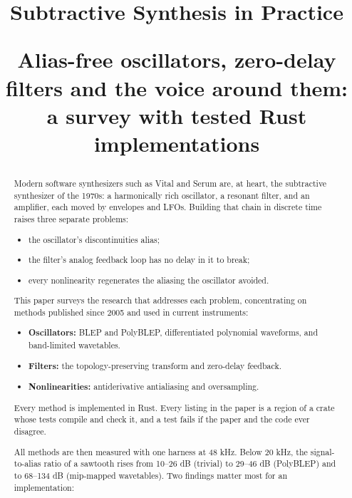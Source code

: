 \documentclass[conference]{IEEEtran}
\begin{document}
\title{Subtractive Synthesis in Practice\\[0.4em]\parbox{0.86\textwidth}{\centering\large Alias-free oscillators, zero-delay filters and the voice around them: a survey with tested Rust implementations}}
\author{
}
\maketitle

\begin{abstract}
Modern software synthesizers such as Vital and Serum are, at heart, the subtractive synthesizer of the 1970s: a harmonically rich oscillator, a resonant filter, and an amplifier, each moved by envelopes and LFOs. Building that chain in discrete time raises three separate problems:

\begin{itemize}
\item the oscillator's discontinuities alias;
\item the filter's analog feedback loop has no delay in it to break;
\item every nonlinearity regenerates the aliasing the oscillator avoided.
\end{itemize}

This paper surveys the research that addresses each problem, concentrating on methods published since 2005 and used in current instruments:

\begin{itemize}
\item \textbf{Oscillators:} BLEP and PolyBLEP, differentiated polynomial waveforms, and band-limited wavetables.
\item \textbf{Filters:} the topology-preserving transform and zero-delay feedback.
\item \textbf{Nonlinearities:} antiderivative antialiasing and oversampling.
\end{itemize}

Every method is implemented in Rust. Every listing in the paper is a region of a crate whose tests compile and check it, and a test fails if the paper and the code ever disagree.

All methods are then measured with one harness at 48 kHz. Below 20 kHz, the signal-to-alias ratio of a sawtooth rises from 10–26 dB (trivial) to 29–46 dB (PolyBLEP) and to 68–134 dB (mip-mapped wavetables). Two findings matter most for an implementation:


\end{abstract}
\end{document}
